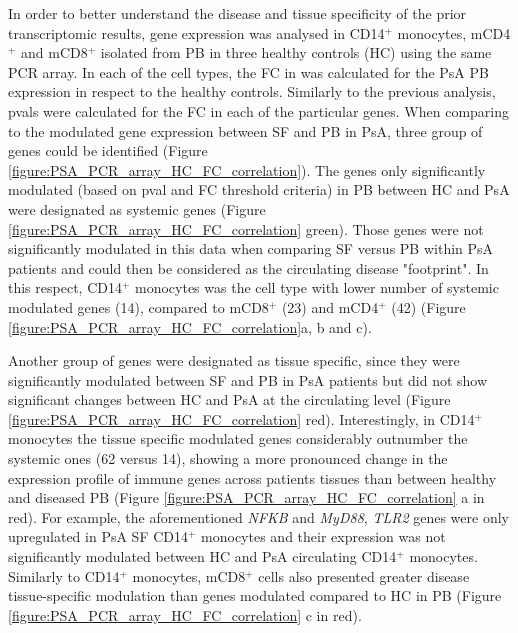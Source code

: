 In order to better understand the disease and tissue specificity of the prior transcriptomic results, gene expression was analysed in CD14$^+$ monocytes, mCD4$^+$ and mCD8$^+$ isolated from PB in three healthy controls (HC) using the same PCR array. In each of the cell types, the FC in  was calculated for the PsA PB expression in respect to the healthy controls. Similarly to the previous analysis, pvals were calculated for the FC in each of the particular genes. When comparing to the modulated gene expression between SF and PB in PsA, three group of genes could be identified (Figure \ref{figure:PSA_PCR_array_HC_FC_correlation}). The genes only significantly modulated (based on pval and FC threshold criteria) in PB between HC and PsA were designated as systemic genes (Figure \ref{figure:PSA_PCR_array_HC_FC_correlation} green). Those genes were not significantly modulated in this data when comparing SF versus PB within PsA patients and could then be considered as the circulating disease "footprint". In this respect, CD14$^+$ monocytes was the cell type with lower number of systemic modulated genes (14), compared to mCD8$^+$ (23) and mCD4$^+$ (42) (Figure \ref{figure:PSA_PCR_array_HC_FC_correlation}a, b and c). 

Another group of genes were designated as tissue specific, since they were significantly modulated between SF and PB in PsA patients but did not show significant changes between HC and PsA at the circulating level (Figure \ref{figure:PSA_PCR_array_HC_FC_correlation} red). Interestingly, in CD14$^+$ monocytes the tissue specific modulated genes considerably outnumber the systemic ones (62 versus 14), showing a more pronounced change in the expression profile of immune genes across patients tissues than between healthy and diseased PB (Figure \ref{figure:PSA_PCR_array_HC_FC_correlation} a in red). For example, the aforementioned \textit{NFKB} and \textit{MyD88}, \textit{TLR2} genes were only upregulated in PsA SF CD14$^+$ monocytes and their expression was not significantly modulated between HC and PsA circulating CD14$^+$ monocytes.  Similarly to CD14$^+$ monocytes, mCD8$^+$ cells also presented greater disease tissue-specific modulation than genes modulated compared to HC in PB (Figure \ref{figure:PSA_PCR_array_HC_FC_correlation} c in red).  


